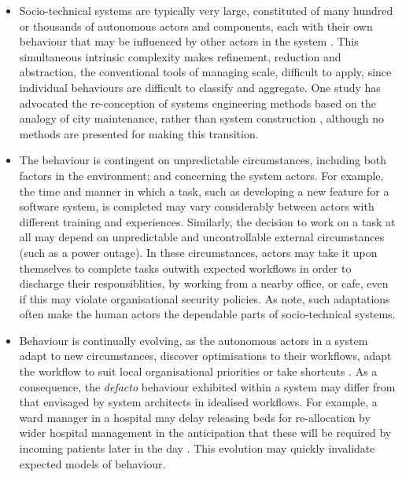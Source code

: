 \documentclass{sig-alternate}
\begin{document}
\begin{itemize}

\item Socio-technical systems are typically very large, constituted of many
  hundred or thousands of autonomous actors and components, each with their own
  behaviour that may be influenced by other actors in the system
  \cite{crabtree00ethnomethodologically}.  This simultaneous intrinsic
  complexity makes refinement, reduction and abstraction, the conventional tools
  of managing scale, difficult to apply, since individual behaviours are
  difficult to classify and aggregate.  One study has advocated the
  re-conception of systems engineering methods based on the analogy of city
  maintenance, rather than system construction \citep{feiler06ultra}, although
  no methods are presented for making this transition.

\item The behaviour is contingent on unpredictable circumstances, including both
  factors in the environment; and concerning the system actors.  For example,
  the time and manner in which a task, such as developing a new feature for a
  software system, is completed may vary considerably between actors with
  different training and experiences.  Similarly, the decision to work on a task
  at all may depend on unpredictable and uncontrollable external circumstances
  (such as a power outage).  In these circumstances, actors may take it upon
  themselves to complete tasks outwith expected workflows in order to discharge
  their responsiblities, by working from a nearby office, or cafe, even if this
  may violate organisational security policies.  As \citet{besnard03human} note,
  such adaptations often make the human actors the dependable parts of
  socio-technical systems.

\item Behaviour is continually evolving, as the autonomous actors in a system
  adapt to new circumstances, discover optimisations to their workflows, adapt
  the workflow to suit local organisational priorities or take shortcuts
  \citep{bonen79evolutionary,Lyytinen2008,anderson04heterogeneous}.  As a
  consequence, the \emph{defacto} behaviour exhibited within a system may differ
  from that envisaged by system architects in idealised workflows.  For example,
  a ward manager in a hospital may delay releasing beds for re-allocation by
  wider hospital management in the anticipation that these will be required by
  incoming patients later in the day \citep{dewsbury07responsibility}.  This
  evolution may quickly invalidate expected models of behaviour.

\end{itemize}
\end{document}
